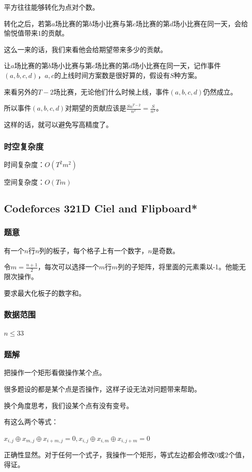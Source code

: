 \documentclass{ctexart}
\begin{document}
平方往往能够转化为点对个数。

转化之后，若第$a$场比赛的第$b$场小比赛与第$c$场比赛的第$d$场小比赛在同一天，会给愉悦值带来$1$的贡献。

这么一来的话，我们来看他会给期望带来多少的贡献。

让$a$场比赛的第$b$场小比赛与第$c$场比赛的第$d$场小比赛在同一天，记作事件$(a,b,c,d)$，$a,c$的上线时间方案数是很好算的，假设有$S$种方案。

来看另外的$T-2$场比赛，无论他们什么时候上线，事件$(a,b,c,d)$仍然成立。

所以事件$(a,b,c,d)$对期望的贡献应该是$\frac{Sn^{T-2}}{n^T}=\frac{S}{n^2}$。

这样的话，就可以避免写高精度了。
\subsubsection{时空复杂度}
时间复杂度：$O(T^2m^2)$

空间复杂度：$O(Tm)$
\subsection{Codeforces 321D Ciel and Flipboard*}
\subsubsection{题意}
有一个$n$行$n$列的板子，每个格子上有一个数字，$n$是奇数。

令$m=\frac{n+1}{2}$，每次可以选择一个$m$行$m$列的子矩阵，将里面的元素乘以-1。他能无限次操作。

要求最大化板子的数字和。
\subsubsection{数据范围}
$n \le 33$
\subsubsection{题解}
把操作一个矩形看做操作某个点。

很多题设的都是某个点是否操作，这样子设无法对问题带来帮助。

换个角度思考，我们设某个点有没有变号。

有这么两个等式：

$x_{i,j} \oplus x_{m,j} \oplus x_{i+m,j}=0,x_{i,j} \oplus x_{i,m} \oplus x_{i,j+m}=0$

正确性显然。对于任何一个式子，我操作一个矩形，等式左边都会修改$0$或$2$个值，得证。
\end{document}

